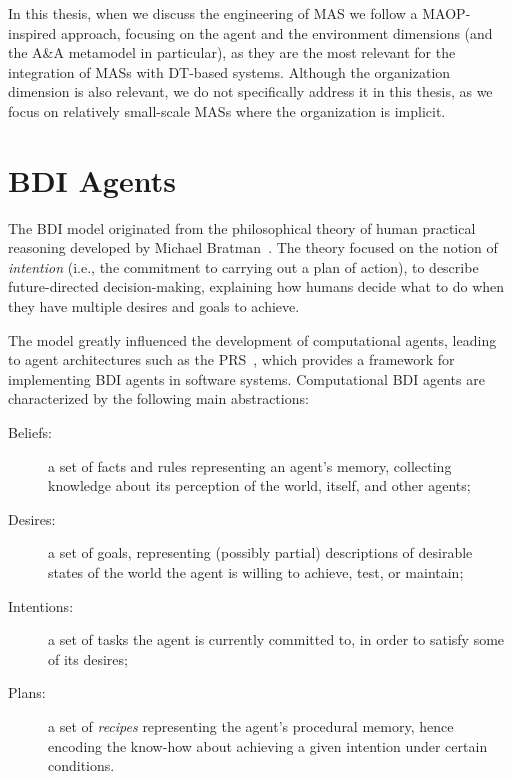 In this thesis, when we discuss the engineering of \ac{MAS} we follow a \ac{MAOP}-inspired approach, focusing on the agent and the environment dimensions (and the A\&A metamodel in particular), as they are the most relevant for the integration of \acp{MAS} with \ac{DT}-based systems.
%
Although the organization dimension is also relevant, we do not specifically address it in this thesis, as we focus on relatively small-scale \acp{MAS} where the organization is implicit.

\section{\acl{BDI} Agents}
The \ac{BDI} model originated from the philosophical theory of human practical reasoning developed by Michael Bratman~\cite{Bratman1987-BRAIPA}.
%
The theory focused on the notion of \emph{intention} (i.e., the commitment to carrying out a plan of action), to describe future-directed decision-making, explaining how humans decide what to do
when they have multiple desires and goals to achieve.

The model greatly influenced the development of computational agents, 
leading to agent architectures such as the \ac{PRS}~\cite{Georgeff_Lansky_1986},
which provides a framework for implementing \ac{BDI} agents in software systems.
%
Computational \ac{BDI} agents are characterized by the following main abstractions:
%
\begin{description}
    \item[Beliefs:] a set of facts and rules representing an agent's memory, collecting knowledge about its perception of the world, itself, and other agents;

    \item[Desires:] a set of goals, representing (possibly partial) descriptions of desirable states of the world
    the agent is willing to achieve, test, or maintain;

    \item[Intentions:] a set of tasks the agent is currently committed to, in order to satisfy some of its desires;

    \item[Plans:] a set of \emph{recipes} representing the agent's procedural memory,
    hence encoding the know-how about achieving a given intention under certain conditions.
\end{description}


